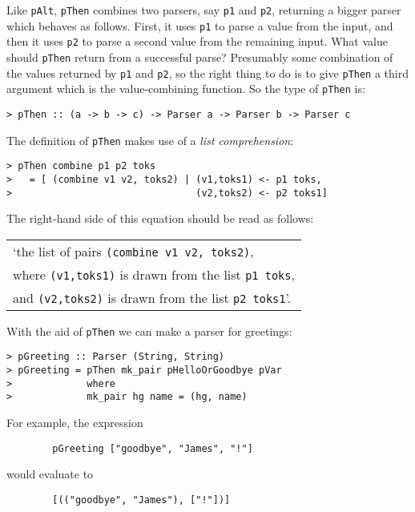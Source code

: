 Like \mbox{\tt pAlt}, \mbox{\tt pThen} combines two parsers, say \mbox{\tt p1} and \mbox{\tt p2},
returning a bigger parser which behaves as follows.
First, it uses \mbox{\tt p1} to parse a value from the input, and then it uses
\mbox{\tt p2} to parse a second value from the remaining input.
What value should \mbox{\tt pThen} return from a successful parse?  Presumably some
combination of the values returned by \mbox{\tt p1} and \mbox{\tt p2}, so the right
thing to do is to give \mbox{\tt pThen} a third argument which is the value-combining
function.  So the type of \mbox{\tt pThen} is:
\begin{verbatim}
> pThen :: (a -> b -> c) -> Parser a -> Parser b -> Parser c
\end{verbatim}
%
\par
The definition of \mbox{\tt pThen} makes use of a
{\em list comprehension\/}:
\begin{verbatim}
> pThen combine p1 p2 toks
>   = [ (combine v1 v2, toks2) | (v1,toks1) <- p1 toks,
>                                (v2,toks2) <- p2 toks1]
\end{verbatim}
%
The right-hand side of this equation should be read as follows:
\begin{center}
\begin{tabular}{l}
`the list of pairs \mbox{\tt (combine\ v1\ v2,\ toks2)}, \\
where \mbox{\tt (v1,toks1)} is drawn from the list \mbox{\tt p1\ toks}, \\
and \mbox{\tt (v2,toks2)} is drawn from the list \mbox{\tt p2\ toks1}'.
\end{tabular}
\end{center}
With the aid of \mbox{\tt pThen} we can make a parser for greetings:
\begin{verbatim}
> pGreeting :: Parser (String, String)
> pGreeting = pThen mk_pair pHelloOrGoodbye pVar
>             where
>             mk_pair hg name = (hg, name)
\end{verbatim}
%
%
For example, the expression
\begin{verbatim}
        pGreeting ["goodbye", "James", "!"]
\end{verbatim}
would evaluate to
\begin{verbatim}
        [(("goodbye", "James"), ["!"])]
\end{verbatim}

